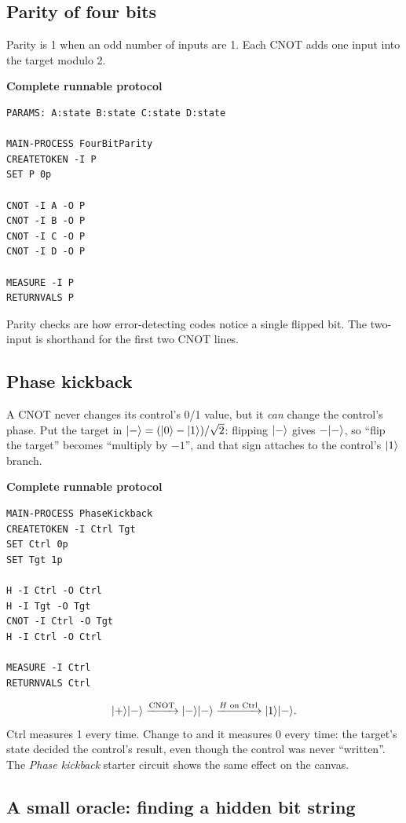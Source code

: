 \subsection{Parity of four bits}

Parity is 1 when an odd number of inputs are 1. Each CNOT adds one input into
the target modulo 2.

\textbf{Complete runnable protocol}
\begin{lstlisting}
PARAMS: A:state B:state C:state D:state

MAIN-PROCESS FourBitParity
CREATETOKEN -I P
SET P 0p

CNOT -I A -O P
CNOT -I B -O P
CNOT -I C -O P
CNOT -I D -O P

MEASURE -I P
RETURNVALS P
\end{lstlisting}
Parity checks are how error-detecting codes notice a single flipped bit. The
two-input  is shorthand for the first two CNOT lines.

\subsection{Phase kickback}
\hypertarget{phase-kickback}{}

A CNOT never changes its control's 0/1 value, but it \emph{can} change the
control's phase. Put the target in $\lvert -\rangle=(\lvert 0\rangle-\lvert 1\rangle)/\sqrt2$: flipping
$\lvert -\rangle$ gives $-\lvert -\rangle$, so ``flip the target'' becomes ``multiply by $-1$'',
and that sign attaches to the control's $\lvert 1\rangle$ branch.

\textbf{Complete runnable protocol}
\begin{lstlisting}
MAIN-PROCESS PhaseKickback
CREATETOKEN -I Ctrl Tgt
SET Ctrl 0p
SET Tgt 1p

H -I Ctrl -O Ctrl
H -I Tgt -O Tgt
CNOT -I Ctrl -O Tgt
H -I Ctrl -O Ctrl

MEASURE -I Ctrl
RETURNVALS Ctrl
\end{lstlisting}
\[
\lvert +\rangle\lvert -\rangle\xrightarrow{\mathrm{CNOT}}\lvert -\rangle\lvert -\rangle
\xrightarrow{H\text{ on Ctrl}}\lvert 1\rangle\lvert -\rangle.
\]
Ctrl measures 1 every time. Change  to 
and it measures 0 every time: the target's state decided the control's
result, even though the control was never ``written''. The \emph{Phase
kickback} starter circuit shows the same effect on the canvas.

\subsection{A small oracle: finding a hidden bit string}

